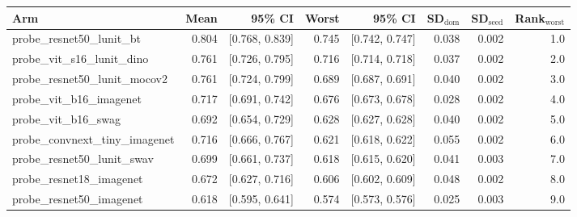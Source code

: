 \begin{tabular}{lrrrrrrr}
\toprule
Arm & Mean & 95\% CI & Worst & 95\% CI & SD$_\text{dom}$ & SD$_\text{seed}$ & Rank$_\text{worst}$ \\
\midrule
probe\_resnet50\_lunit\_bt & 0.804 & [0.768, 0.839] & 0.745 & [0.742, 0.747] & 0.038 & 0.002 & 1.0 \\
probe\_vit\_s16\_lunit\_dino & 0.761 & [0.726, 0.795] & 0.716 & [0.714, 0.718] & 0.037 & 0.002 & 2.0 \\
probe\_resnet50\_lunit\_mocov2 & 0.761 & [0.724, 0.799] & 0.689 & [0.687, 0.691] & 0.040 & 0.002 & 3.0 \\
probe\_vit\_b16\_imagenet & 0.717 & [0.691, 0.742] & 0.676 & [0.673, 0.678] & 0.028 & 0.002 & 4.0 \\
probe\_vit\_b16\_swag & 0.692 & [0.654, 0.729] & 0.628 & [0.627, 0.628] & 0.040 & 0.002 & 5.0 \\
probe\_convnext\_tiny\_imagenet & 0.716 & [0.666, 0.767] & 0.621 & [0.618, 0.622] & 0.055 & 0.002 & 6.0 \\
probe\_resnet50\_lunit\_swav & 0.699 & [0.661, 0.737] & 0.618 & [0.615, 0.620] & 0.041 & 0.003 & 7.0 \\
probe\_resnet18\_imagenet & 0.672 & [0.627, 0.716] & 0.606 & [0.602, 0.609] & 0.048 & 0.002 & 8.0 \\
probe\_resnet50\_imagenet & 0.618 & [0.595, 0.641] & 0.574 & [0.573, 0.576] & 0.025 & 0.003 & 9.0 \\
\bottomrule
\end{tabular}
